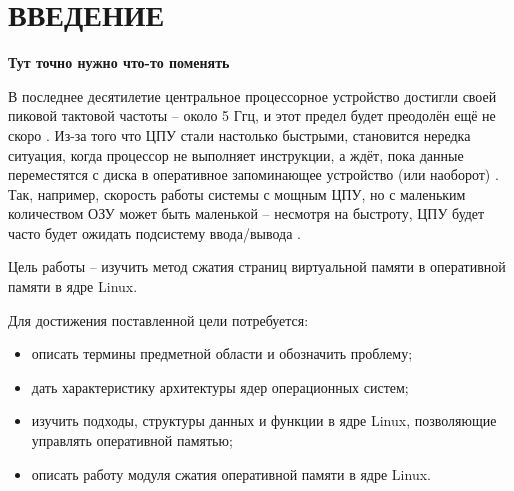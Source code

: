 \section*{ВВЕДЕНИЕ}

\textbf{Тут точно нужно что-то поменять}

В последнее десятилетие центральное процессорное устройство  достигли своей пиковой тактовой частоты -- около 5 Ггц, и этот предел будет преодолён ещё не скоро \cite{cpu_pick}. Из-за того что ЦПУ стали настолько быстрыми, становится нередка ситуация, когда процессор не выполняет инструкции, а ждёт, пока данные переместятся с диска в оперативное запоминающее устройство (или наоборот) \cite{in-kernel-memory-compression}. Так, например, скорость работы системы с мощным ЦПУ, но с маленьким количеством ОЗУ может быть маленькой -- несмотря на быстроту, ЦПУ будет часто будет ожидать подсистему ввода/вывода \cite{in-kernel-memory-compression}.

Цель работы -- изучить метод сжатия страниц виртуальной памяти в оперативной памяти в ядре Linux.

Для достижения поставленной цели потребуется:

\begin{itemize}
	\item описать термины предметной области и обозначить проблему;
	\item дать характеристику архитектуры ядер операционных систем;
	\item изучить подходы, структуры данных и функции в ядре Linux, позволяющие управлять оперативной памятью;
	\item описать работу модуля сжатия оперативной памяти в ядре Linux.
\end{itemize}

\pagebreak
